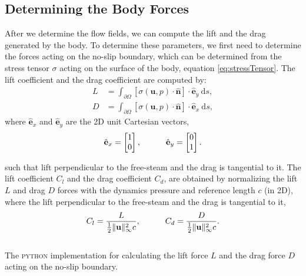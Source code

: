 \subsection{Determining the Body Forces}

After we determine the flow fields, we can compute the lift and the drag generated by the body. To determine these parameters, we first need to determine the forces acting on the no-slip boundary, which can be determined from the stress tensor $\sigma$ acting on the surface of the body, equation \ref{eq:stressTensor}. The lift coefficient and the drag coefficient are computed by:
	\begin{subequations}
	\begin{align}
	L &= \int_{\partial \Omega} \left[\sigma(\mathbf{u},p) \cdot \hat{\mathbf{n}}\right]\cdot \hat{\mathbf{e}}_y\ \mathrm{d}s,\\
	D &= \int_{\partial \Omega} \left[\sigma(\mathbf{u},p) \cdot \hat{\mathbf{n}}\right]\cdot \hat{\mathbf{e}}_x\ \mathrm{d}s,
	\end{align}
	\label{eq:LiftDragEq}
	\end{subequations}
where $\hat{\mathbf{e}}_x$ and $\hat{\mathbf{e}}_y$ are the 2D unit Cartesian vectors,
	\begin{equation}
	\hat{\mathbf{e}}_x = \begin{bmatrix}
	 1 \\ 
	 0 
	\end{bmatrix}, \qquad \quad 
	\hat{\mathbf{e}}_y = \begin{bmatrix}
		 0 \\ 
		 1 
		\end{bmatrix}.\\
	\end{equation}

such that lift perpendicular to the free-steam and the drag is tangential to it. The lift coefficient $C_l$ and the drag coefficient $C_d$, are obtained by normalizing the lift $L$ and drag $D$ forces with the dynamics pressure and reference length $c$ (in 2D), where the lift perpendicular to the free-steam and the drag is tangential to it,
		\begin{equation}
		C_l = \frac{L}{\frac{1}{2}\lVert\mathbf{u}\rVert_{\infty}^2 c},\qquad \quad
		C_d = \frac{D}{\frac{1}{2}\lVert\mathbf{u}\rVert_{\infty}^2 c}.\\
		\label{eq:LiftDragCoeffEq}
		\end{equation}


	\begin{listing}[!h]
	\inputminted[fontseries=courier,obeytabs,fontsize=\footnotesize,mathescape,linenos,numbersep=5pt,frame=lines,framesep=2mm,xleftmargin=20mm,xrightmargin=20mm]{python}{figures/eulerian/forces.py}
	\caption{The \textsc{python} implementation for calculating the lift force $L$ and the drag force $D$ acting on the no-slip boundary.}
	\label{lst:pycode-forceCalculation}
	\end{listing}

